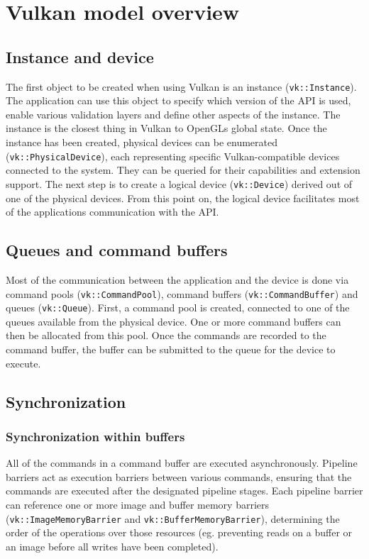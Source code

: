 \documentclass[times, utf8, zavrsni, numeric]{fer}
\begin{document}
\section{Vulkan model overview}
\subsection{Instance and device}
The first object to be created when using Vulkan is an instance (\texttt{vk::Instance}). The application can use this object to specify which version of the API is used, enable various validation layers and define other aspects of the instance. The instance is the closest thing in Vulkan to OpenGLs global state. Once the instance has been created, physical devices can be enumerated (\texttt{vk::PhysicalDevice}), each representing specific Vulkan-compatible devices connected to the system. They can be queried for their capabilities and extension support. The next step is to create a logical device (\texttt{vk::Device}) derived out of one of the physical devices. From this point on, the logical device facilitates most of the applications communication with the API.

\subsection{Queues and command buffers}
Most of the communication between the application and the device is done via command pools (\texttt{vk::CommandPool}), command buffers (\texttt{vk::CommandBuffer}) and queues (\texttt{vk::Queue}). First, a command pool is created, connected to one of the queues available from the physical device. One or more command buffers can then be allocated from this pool. Once the commands are recorded to the command buffer, the buffer can be submitted to the queue for the device to execute.

\subsection{Synchronization}
\subsubsection{Synchronization within buffers}
All of the commands in a command buffer are executed asynchronously. Pipeline barriers act as execution barriers between various commands, ensuring that the commands are executed after the designated pipeline stages. Each pipeline barrier can reference one or more image and buffer memory barriers (\texttt{vk::ImageMemoryBarrier} and \texttt{vk::BufferMemoryBarrier}), determining the order of the operations over those resources (eg. preventing reads on a buffer or an image before all writes have been completed).
\end{document}
